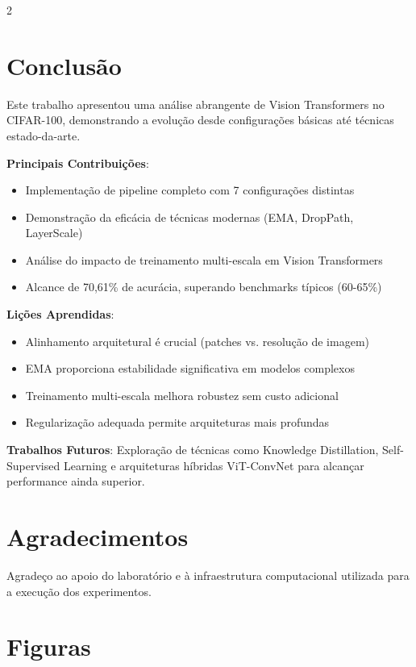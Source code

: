 \documentclass[conference]{IEEEtran}
\begin{document}
\begin{multicols}{2}
\section{Conclusão}
Este trabalho apresentou uma análise abrangente de Vision Transformers no CIFAR-100, demonstrando a evolução desde configurações básicas até técnicas estado-da-arte.

\textbf{Principais Contribuições}:
\begin{itemize}
    \item Implementação de pipeline completo com 7 configurações distintas
    \item Demonstração da eficácia de técnicas modernas (EMA, DropPath, LayerScale)
    \item Análise do impacto de treinamento multi-escala em Vision Transformers
    \item Alcance de 70,61\% de acurácia, superando benchmarks típicos (60-65\%)
\end{itemize}

\textbf{Lições Aprendidas}:
\begin{itemize}
    \item Alinhamento arquitetural é crucial (patches vs. resolução de imagem)
    \item EMA proporciona estabilidade significativa em modelos complexos
    \item Treinamento multi-escala melhora robustez sem custo adicional
    \item Regularização adequada permite arquiteturas mais profundas
\end{itemize}

\textbf{Trabalhos Futuros}: Exploração de técnicas como Knowledge Distillation, Self-Supervised Learning e arquiteturas híbridas ViT-ConvNet para alcançar performance ainda superior.

\section*{Agradecimentos}
Agradeço ao apoio do laboratório e à infraestrutura computacional utilizada para a execução dos experimentos.

\end{multicols}

\section*{Figuras}
\end{document}
